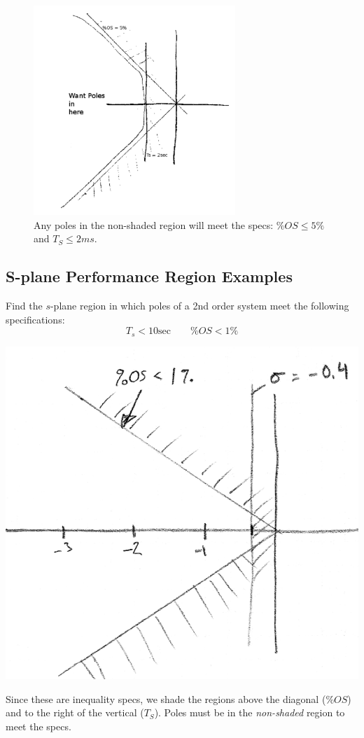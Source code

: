 \begin{figure}\centering
\includegraphics[width=3.0in]{figs11/00473a.png}
\caption{Any poles in the non-shaded region will meet  the specs: $\%OS \leq 5\%$ and $T_S \leq 2ms$.}\label{splaneregion}
\end{figure}

\subsection{S-plane Performance Region Examples}


\begin{ExampleSmall}
Find the $s$-plane region in which poles of a 2nd order system meet the following specifications:
\[
T_s < 10 \mathrm{sec} \qquad \%OS < 1\%
\]

\includegraphics[width=3.in]{figs09/00788a.png}

Since these are inequality specs, we shade the regions above the diagonal ($\%OS$) and to the right of the vertical ($T_S$).  Poles must be in the {\it non-shaded} region to meet the specs.
\end{ExampleSmall}


